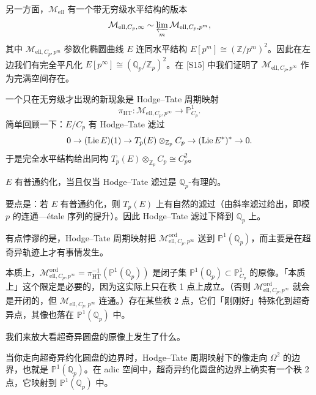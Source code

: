 另一方面，$\mathcal{M}_{\mathrm{ell}}$ 有一个带无穷级水平结构的版本
\[
\mathcal{M}_{\mathrm{ell},C_p,\infty}\sim\varprojlim_{m}\mathcal{M}_{\mathrm{ell},C_p,p^m},
\]
其中 $\mathcal{M}_{\mathrm{ell},C_p,p^m}$ 参数化椭圆曲线 $E$ 连同水平结构 $E[p^m]\cong(\mathbb{Z}/p^m)^2$。因此在左边我们有完全平凡化 $E[p^\infty]\cong(\mathbb{Q}_p/\mathbb{Z}_p)^2$。在 [S15] 中我们证明了 $\mathcal{M}_{\mathrm{ell},C_p,p^\infty}$ 作为完满空间存在。

一个只在无穷级才出现的新现象是 Hodge--Tate 周期映射
\[
\pi_{\mathrm{HT}}\colon\mathcal{M}_{\mathrm{ell},C_p,p^\infty}\to\mathbb{P}^1_{C_p}.
\]
简单回顾一下：$E/C_p$ 有 Hodge--Tate 滤过
\[
0\to(\operatorname{Lie} E)(1)\to T_p(E)\otimes_{\mathbb{Z}_p}C_p\to(\operatorname{Lie} E^*)^*\to0.
\]
于是完全水平结构给出同构 $T_p(E)\otimes_{\mathbb{Z}_p}C_p\cong C_p^2$。

\begin{proposition}
$E$ 有普通约化，当且仅当 Hodge--Tate 滤过是 $\mathbb{Q}_p$-有理的。
\end{proposition}

要点是：若 $E$ 有普通约化，则 $T_p(E)$ 上有自然的滤过（由斜率滤过给出，即模 $p$ 的连通—étale 序列的提升）。因此 Hodge--Tate 滤过下降到 $\mathbb{Q}_p$ 上。

\begin{center}
\end{center}
\begin{center}
\end{center}

有点悖谬的是，Hodge--Tate 周期映射把 $\mathcal{M}^{\mathrm{ord}}_{\mathrm{ell},C_p,p^\infty}$ 送到 $\mathbb{P}^1(\mathbb{Q}_p)$，而主要是在超奇异轨迹上才有事情发生。

本质上，$\mathcal{M}^{\mathrm{ord}}_{\mathrm{ell},C_p,p^\infty}=\pi_{\mathrm{HT}}^{-1}(\mathbb{P}^1(\mathbb{Q}_p))$ 是闭子集 $\mathbb{P}^1(\mathbb{Q}_p)\subset\mathbb{P}^1_{C_p}$ 的原像。「本质上」这个限定是必要的，因为这实际上只在秩 1 点上成立。（否则 $\mathcal{M}^{\mathrm{ord}}_{\mathrm{ell},C_p,p^\infty}$ 就会是开闭的，但 $\mathcal{M}_{\mathrm{ell},C_p,p^\infty}$ 连通。）存在某些秩 2 点，它们「刚刚好」特殊化到超奇异点，其像也落在 $\mathbb{P}^1(\mathbb{Q}_p)$ 中。

我们来放大看超奇异圆盘的原像上发生了什么。

当你走向超奇异约化圆盘的边界时，Hodge--Tate 周期映射下的像走向 $\Omega^2$ 的边界，也就是 $\mathbb{P}^1(\mathbb{Q}_p)$。在 adic 空间中，超奇异约化圆盘的边界上确实有一个秩 2 点，它映射到 $\mathbb{P}^1(\mathbb{Q}_p)$ 中。

